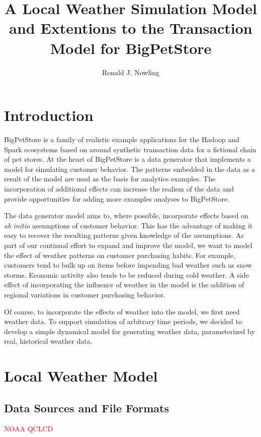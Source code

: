 \documentclass[11pt, letterpaper]{article}
\begin{document}
\title{A Local Weather Simulation Model and Extentions to the Transaction Model for BigPetStore}
\author{Ronald J. Nowling}

\maketitle

\newpage

\tableofcontents

\newpage

\section{Introduction}
BigPetStore is a family of realistic example applications for the Hadoop and Spark ecosystems based on around synthetic transaction data for a fictional chain of pet stores.  At the heart of BigPetStore is a data generator that implements a model for simulating customer behavior.  The patterns embedded in the data as a result of the model are used as the basis for analytics examples.  The incorporation of additional effects can increase the realism of the data and provide opportunities for adding more examples analyses to BigPetStore.

The data generator model aims to, where possible, incorporate effects based on \emph{ab initio} assumptions of customer behavior.  This has the advantage of making it easy to recover the resulting patterns given knowledge of the assumptions.  As part of our continual effort to expand and improve the model, we want to model the effect of weather patterns on customer purchasing habits.  For example, customers tend to bulk up on items before impending bad weather such as snow storms.  Economic activity also tends to be reduced during cold weather.  A side effect of incorporating the influence of weather in the model is the addition of regional variations in customer purchasing behavior.

Of course, to incorporate the effects of weather into the model, we first need weather data. To support simulation of arbitrary time periods, we decided to develop a simple dynamical model for generating weather data, parameterized by real, historical weather data.

\newpage
\section{Local Weather Model}

\subsection{Data Sources and File Formats}
\textcolor{red}{NOAA QCLCD}
\end{document}
